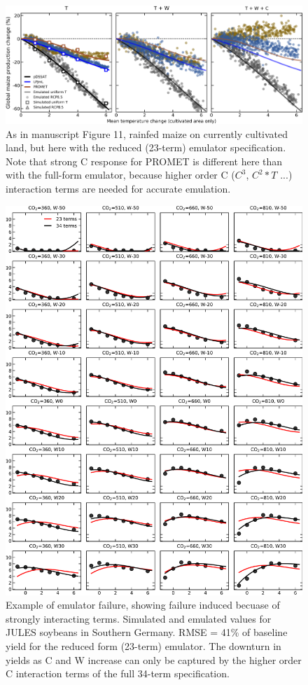 \documentclass[12pt]{article}
\begin{document}
\begin{figure}[h!]
  \centering
  \includegraphics[width = 16.3cm]{reduced_global_em_maize.png}
  \caption{
  As in manuscript Figure 11, rainfed maize on currently cultivated land, but here with the reduced (23-term) emulator specification. Note that strong C response for PROMET is different here than with the full-form emulator, because higher order C ($C^{3}$, $C^{2} * T$ ...) interaction terms are needed for accurate emulation. 
  }
\end{figure}

\begin{figure}[h!]
  \centering
  \includegraphics[width=14cm]{JULES_soy_bad.png}
  \caption{
  Example of emulator failure, showing failure induced becuase of strongly interacting terms. 
  Simulated and emulated values for JULES soybeans in Southern Germany. RMSE = 41\% of baseline yield for the reduced form (23-term) emulator.
  The downturn in yields as C and W increase can only be captured by the higher order C interaction terms of the full 34-term specification. 
  }
  \label{fig:lpjmlrice}
\end{figure}
\end{document}
